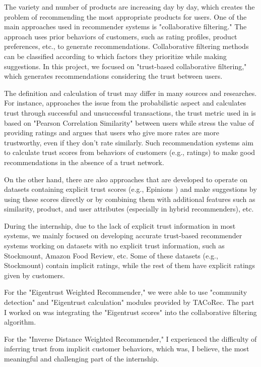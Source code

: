 The variety and number of products are increasing day by day, which creates the problem of recommending the most appropriate products for users. One of the main approaches used in recommender systems is "collaborative filtering." The approach uses prior behaviors of customers, such as rating profiles, product preferences, etc., to generate recommendations. Collaborative filtering methods can be classified according to which factors they prioritize while making suggestions. In this project, we focused on "trust-based collaborative filtering," which generates recommendations considering the trust between users. 

The definition and calculation of trust may differ in many sources and researches. For instance, \cite{Eigentrust} approaches the issue from the probabilistic aspect and calculates trust through successful and unsuccessful transactions, the trust metric used in \cite{papagelis_article} is based on "Pearson Correlation Similarity" between users while \cite{lathia_article} stress the value of providing ratings and argues that users who give more rates are more trustworthy, even if they don't rate similarly. Such recommendation systems aim to calculate trust scores from behaviors of customers (e.g., ratings) to make good recommendations in the absence of a trust network.

On the other hand, there are also approaches\cite{massa_article} that are developed to operate on datasets containing explicit trust scores (e.g., Epinions \cite{Epinions}) and make suggestions by using these scores directly or by combining them with additional features such as similarity, product, and user attributes (especially in hybrid recommenders), etc. 

During the internship, due to the lack of explicit trust information in most systems, we mainly focused on developing accurate trust-based recommender systems working on datasets with no explicit trust information, such as Stockmount, Amazon Food Review, etc. Some of these datasets (e.g., Stockmount) contain implicit ratings, while the rest of them have explicit ratings given by customers.

For the "Eigentrust Weighted Recommender," we were able to use "community detection" and "Eigentrust calculation" modules provided by TACoRec. The part I worked on was integrating the "Eigentrust scores" into the collaborative filtering algorithm. 

For the "Inverse Distance Weighted Recommender," I experienced the difficulty of inferring trust from implicit customer behaviors, which was, I believe, the most meaningful and challenging part of the internship.
